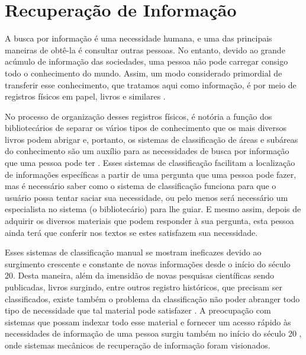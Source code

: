 \section{Recuperação de Informação} \label{sec:RecuperaçãoInformação}



A busca por informação é uma necessidade humana, e uma das principais maneiras de obtê-la é consultar outras pessoas.
No entanto, devido ao grande acúmulo de informação das sociedades, uma pessoa não pode carregar consigo todo o conhecimento do mundo.
Assim, um modo considerado primordial de transferir esse conhecimento, que tratamos aqui como informação, é por meio de registros físicos em papel, livros e similares \cite[p.~1]{Grossman2004IRAH}.

No processo de organização desses registros físicos, é notória a função dos bibliotecários de separar os vários tipos de conhecimento que os mais diversos livros podem abrigar e, portanto, os sistemas de classificação de áreas e subáreas do conhecimento são um auxílio para as necessidades de busca por informação que uma pessoa pode ter \cite[p.~1]{Manning2008IIR} \cite[p.~1446]{Sanderson2012THIRR} \cite[p.~6]{Baeza-Yates1999}. 
Esses sistemas de classificação facilitam a localização de informações específicas a partir de uma pergunta que uma pessoa pode fazer, mas é necessário saber como o sistema de classificação funciona para que o usuário possa tentar saciar sua necessidade, ou pelo menos será necessário um especialista no sistema (o bibliotecário) para lhe guiar.
E mesmo assim, depois de adquirir os diversos materiais que podem responder à sua pergunta, esta pessoa ainda terá que conferir nos textos se estes satisfazem sua necessidade.


Esses sistemas de classificação manual se mostram ineficazes devido ao surgimento crescente e constante de novas informações \cite[p.~6]{Baeza-Yates1999} desde o início do século 20. 
Desta maneira, além da imensidão de novas pesquisas científicas sendo publicadas, livros surgindo, entre outros registro históricos, que precisam ser classificados, existe também o problema da classificação não poder abranger todo tipo de necessidade que tal material pode satisfazer \cite[p.~1444]{Sanderson2012THIRR}. 
A preocupação com sistemas que possam indexar todo esse material e fornecer um acesso rápido às necessidades de informação de uma pessoa surgiu também no início do século 20 \cite{Bush:1979:WMT:1113634.1113638}, onde sistemas mecânicos de recuperação de informação foram visionados.


